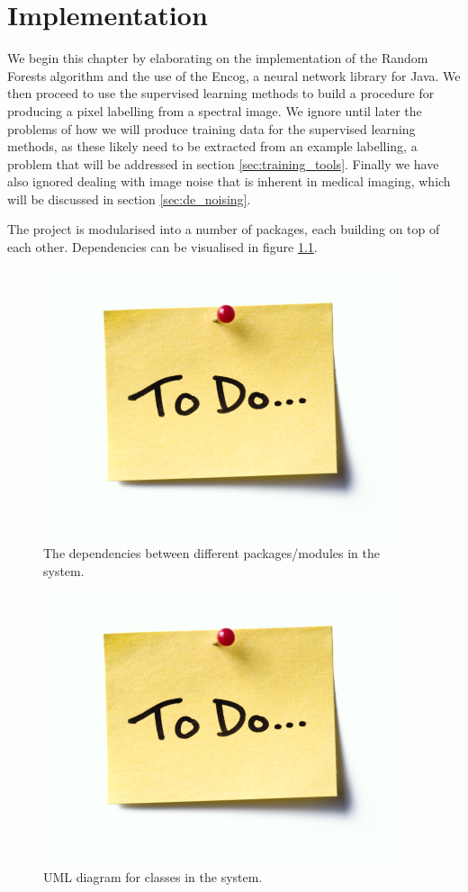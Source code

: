 \documentclass[12pt,twoside,notitlepage]{report}
\begin{document}
\chapter{Implementation}
    We begin this chapter by elaborating on the implementation of the Random Forests algorithm and the use of the Encog, a 
    neural network library for Java. We then proceed to use the supervised learning methods to build a procedure for 
    producing a pixel labelling from a spectral image. We ignore until later the problems of how we will produce 
    training data for the supervised learning methods, as these likely need to be extracted from an example labelling, 
    a problem that will be addressed in section \ref{sec:training_tools}. Finally we have also ignored dealing with 
    image noise that is inherent in medical imaging, which will be discussed in section \ref{sec:de_noising}.

    The project is modularised into a number of packages, each building on top of each other. Dependencies can be 
    visualised in figure \ref{fig:package_dependencies}.

    \begin{figure}[H]
        \centering
        \includegraphics[scale=0.5]{todo}
        \caption{The dependencies between different packages/modules in the system.}
        \label{fig:package_dependencies}
    \end{figure}

    \begin{figure}[H]
        \centering
        \includegraphics[scale=0.5]{todo}
        \caption{UML diagram for classes in the system.}
    \end{figure}
\end{document}

